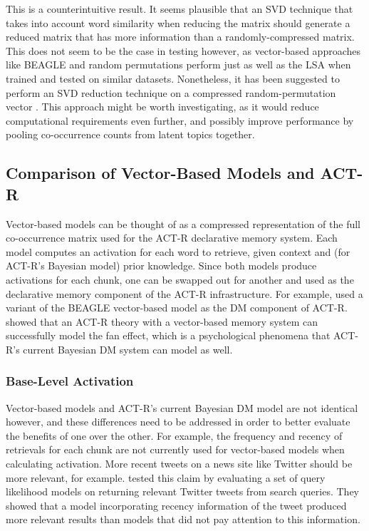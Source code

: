 \documentclass[man,floatsintext,donotrepeattitle]{apa6}
\begin{document}
This is a counterintuitive result.
It seems plausible that an SVD technique that takes into account word similarity when reducing the matrix should generate a reduced matrix that has more information than a randomly-compressed matrix.
This does not seem to be the case in testing however, as vector-based approaches like BEAGLE and random permutations perform just as well as the LSA when trained and tested on similar datasets.
Nonetheless, it has been suggested to perform an SVD reduction technique on a compressed random-permutation vector \parencite{Kanerva2000}.
This approach might be worth investigating, as it would reduce computational requirements even further, and possibly improve performance by pooling co-occurrence counts from latent topics together.

\subsection{Comparison of Vector-Based Models and ACT-R}

Vector-based models can be thought of as a compressed representation of the full co-occurrence matrix used for the ACT-R declarative memory system.
Each model computes an activation for each word to retrieve, given context and (for ACT-R's Bayesian model) prior knowledge.
Since both models produce activations for each chunk, one can be swapped out for another and used as the declarative memory component of the ACT-R infrastructure.
For example, \textcite{Rutledge2007} used a variant of the BEAGLE vector-based model as the DM component of ACT-R.
\textcite{Rutledge2008} showed that an ACT-R theory with a vector-based memory system can successfully model the fan effect, which is a psychological phenomena that ACT-R's current Bayesian DM system can model as well.

\subsubsection{Base-Level Activation}

Vector-based models and ACT-R's current Bayesian DM model are not identical however, and these differences need to be addressed in order to better evaluate the benefits of one over the other.
For example, the frequency and recency of retrievals for each chunk are not currently used for vector-based models when calculating activation.
More recent tweets on a news site like Twitter should be more relevant, for example.
\textcite{Efron2011} tested this claim by evaluating a set of query likelihood models on returning relevant Twitter tweets from search queries.
They showed that a model incorporating recency information of the tweet produced more relevant results than models that did not pay attention to this information.
\end{document}
